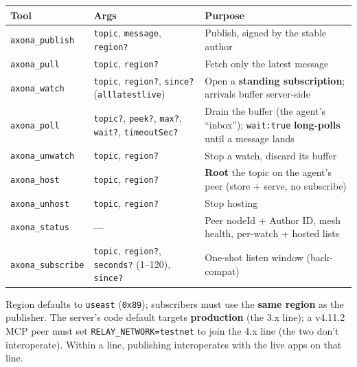 \documentclass[
  nobib]{tufte-handout}
\newcounter{none} %
\begin{document}
{\def\LTcaptype{none} %
\begin{longtable}[]{@{}
  >{\raggedright\arraybackslash}p{}
  >{\raggedright\arraybackslash}p{}
  >{\raggedright\arraybackslash}p{}@{}}
\toprule\noalign{}
\begin{minipage}[b]{\linewidth}\raggedright
Tool
\end{minipage} & \begin{minipage}[b]{\linewidth}\raggedright
Args
\end{minipage} & \begin{minipage}[b]{\linewidth}\raggedright
Purpose
\end{minipage} \\
\midrule\noalign{}
\endhead
\bottomrule\noalign{}
\endlastfoot
\texttt{axona\_publish} & \texttt{topic}, \texttt{message},
\texttt{region?} & Publish, signed by the stable author \\
\texttt{axona\_pull} & \texttt{topic}, \texttt{region?} & Fetch only the
latest message \\
\texttt{axona\_watch} & \texttt{topic}, \texttt{region?},
\texttt{since?}
(\texttt{all}\textbar{}\texttt{latest}\textbar{}\texttt{live}) & Open a
\textbf{standing subscription}; arrivals buffer server-side \\
\texttt{axona\_poll} & \texttt{topic?}, \texttt{peek?}, \texttt{max?},
\texttt{wait?}, \texttt{timeoutSec?} & Drain the buffer (the agent's
``inbox''); \texttt{wait:true} \textbf{long-polls} until a message
lands \\
\texttt{axona\_unwatch} & \texttt{topic}, \texttt{region?} & Stop a
watch, discard its buffer \\
\texttt{axona\_host} & \texttt{topic}, \texttt{region?} & \textbf{Root}
the topic on the agent's peer (store + serve, no subscribe) \\
\texttt{axona\_unhost} & \texttt{topic}, \texttt{region?} & Stop
hosting \\
\texttt{axona\_status} & --- & Peer nodeId + Author ID, mesh health,
per-watch + hosted lists \\
\texttt{axona\_subscribe} & \texttt{topic}, \texttt{region?},
\texttt{seconds?} (1--120), \texttt{since?} & One-shot listen window
(back-compat) \\
\end{longtable}
}

Region defaults to \texttt{useast} (\texttt{0x89}); subscribers must use
the \textbf{same region} as the publisher. The server's code default
targets \textbf{production} (the 3.x line); a v4.11.2 MCP peer must set
\texttt{RELAY\_NETWORK=testnet} to join the 4.x line (the two don't
interoperate). Within a line, publishing interoperates with the live
apps on that line.
\end{document}
